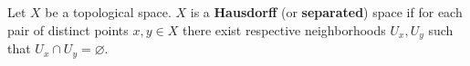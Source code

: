 Let $X$ be a topological space. $X$ is a \textbf{Hausdorff} (or \textbf{separated}) space if for each pair of distinct points $x, y \in X$ there exist respective neighborhoods $U_x, U_y$ such that $U_x \cap U_y = \varnothing$.
